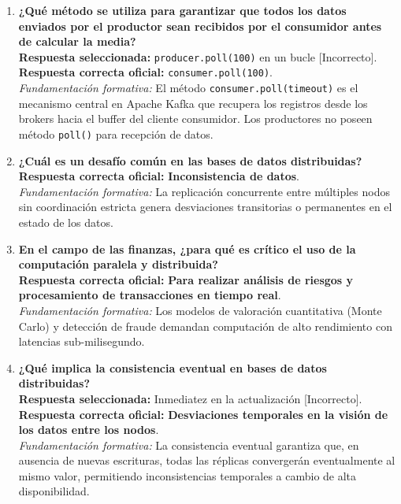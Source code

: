 \documentclass[11pt,a4paper]{article}
\begin{document}
\begin{enumerate}[label=\textbf{Pregunta \arabic*.}]
    \item \textbf{¿Qué método se utiliza para garantizar que todos los datos enviados por el productor sean recibidos por el consumidor antes de calcular la media?}\\
    \textbf{Respuesta seleccionada:} \texttt{producer.poll(100)} en un bucle [Incorrecto].\\
    \textbf{Respuesta correcta oficial:} \texttt{consumer.poll(100)}.\\
    \textit{Fundamentación formativa:} El método \texttt{consumer.poll(timeout)} es el mecanismo central en Apache Kafka que recupera los registros desde los brokers hacia el buffer del cliente consumidor. Los productores no poseen método \texttt{poll()} para recepción de datos.

    \item \textbf{¿Cuál es un desafío común en las bases de datos distribuidas?}\\
    \textbf{Respuesta correcta oficial:} \textbf{Inconsistencia de datos}.\\
    \textit{Fundamentación formativa:} La replicación concurrente entre múltiples nodos sin coordinación estricta genera desviaciones transitorias o permanentes en el estado de los datos.

    \item \textbf{En el campo de las finanzas, ¿para qué es crítico el uso de la computación paralela y distribuida?}\\
    \textbf{Respuesta correcta oficial:} \textbf{Para realizar análisis de riesgos y procesamiento de transacciones en tiempo real}.\\
    \textit{Fundamentación formativa:} Los modelos de valoración cuantitativa (Monte Carlo) y detección de fraude demandan computación de alto rendimiento con latencias sub-milisegundo.

    \item \textbf{¿Qué implica la consistencia eventual en bases de datos distribuidas?}\\
    \textbf{Respuesta seleccionada:} Inmediatez en la actualización [Incorrecto].\\
    \textbf{Respuesta correcta oficial:} \textbf{Desviaciones temporales en la visión de los datos entre los nodos}.\\
    \textit{Fundamentación formativa:} La consistencia eventual garantiza que, en ausencia de nuevas escrituras, todas las réplicas convergerán eventualmente al mismo valor, permitiendo inconsistencias temporales a cambio de alta disponibilidad.


\end{enumerate}
\end{document}
